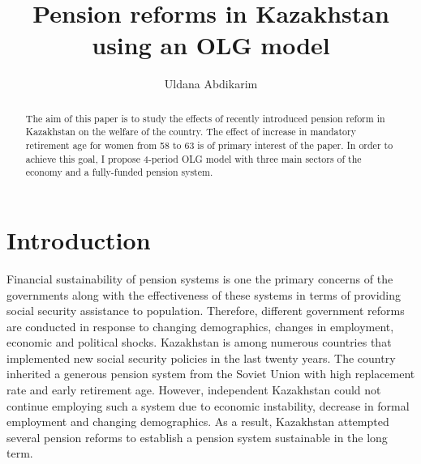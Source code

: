 \documentclass[ProjectUYA]{subfiles}
\begin{document}
\providecommand{\versn}{pdf} %
\ifthenelse{\boolean{Web}}{    %
  \renewcommand{\versn}{Web}     %
  \renewcommand{\rootFromOut}{.} %
}{}  %


\title{Pension reforms in Kazakhstan using an OLG model}

\author{Uldana Abdikarim\authNum}





\maketitle
\hypertarget{abstract}{}
\begin{abstract}
  The aim of this paper is to study the effects of recently introduced pension reform in Kazakhstan on the welfare of the country. The effect of increase in mandatory retirement age for women from 58 to 63 is of primary interest of the paper. In order to achieve this goal, I propose 4-period OLG model with three main sectors of the economy and a fully-funded pension system.
\end{abstract}





{\titlepagefinish}


\section{Introduction}\label{sec:intro}
Financial sustainability of pension systems is one the primary concerns of the governments along with the effectiveness of these systems in terms of providing social security assistance to population. Therefore, different government reforms are conducted in response to changing demographics, changes in employment, economic and political shocks. Kazakhstan is among numerous countries that implemented new social security policies in the last twenty years. The country inherited a generous pension system from the Soviet Union with high replacement rate and early retirement age. However, independent Kazakhstan could not continue employing such a system due to economic instability, decrease in formal employment and changing demographics. As a result, Kazakhstan attempted several pension reforms to establish a pension system sustainable in the long term. 
\end{document}
